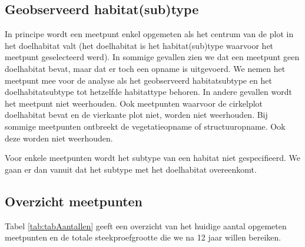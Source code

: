 \documentclass[twoside]{extreport}
\begin{document}
\subsection{Geobserveerd
habitat(sub)type}\label{geobserveerd-habitatsubtype}

In principe wordt een meetpunt enkel opgemeten als het centrum van de
plot in het doelhabitat valt (het doelhabitat is het habitat(sub)type
waarvoor het meetpunt geselecteerd werd). In sommige gevallen zien we
dat een meetpunt geen doelhabitat bevat, maar dat er toch een opname is
uitgevoerd. We nemen het meetpunt mee voor de analyse als het
geobserveerd habitatsubtype en het doelhabitatsubtype tot hetzelfde
habitattype behoren. In andere gevallen wordt het meetpunt niet
weerhouden. Ook meetpunten waarvoor de cirkelplot doelhabitat bevat en
de vierkante plot niet, worden niet weerhouden. Bij sommige meetpunten
ontbreekt de vegetatieopname of structuuropname. Ook deze worden niet
weerhouden.

Voor enkele meetpunten wordt het subtype van een habitat niet
gespecifieerd. We gaan er dan vanuit dat het subtype met het doelhabitat
overeenkomt.

\subsection{Overzicht meetpunten}\label{overzicht-meetpunten}

Tabel \ref{tab:tabAantallen} geeft een overzicht van het huidige aantal
opgemeten meetpunten en de totale steekproefgrootte die we na 12 jaar
willen bereiken.
\end{document}
